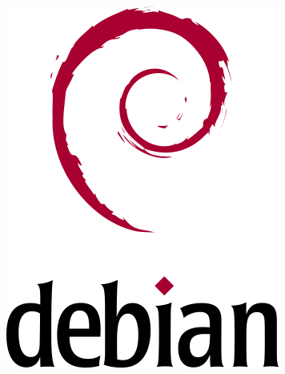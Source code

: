 \begin{frame}
\begin{columns}
\begin{column}{.34\linewidth}
			\includegraphics[width=\linewidth]{../graphics/logos/Debian/openlogo.png}
		\end{column}
	\end{columns}
	\vfill
\end{frame}
